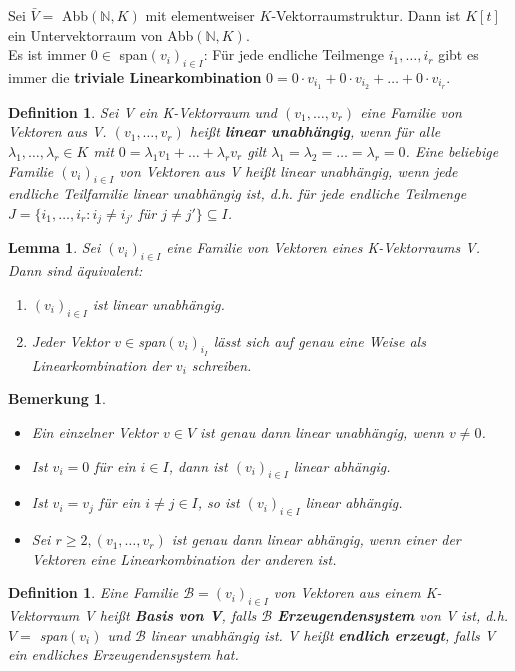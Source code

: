 \documentclass[12pt,a4paper]{article}
\theoremstyle{plain}
\newtheorem{Lemma}[Theorem]{Lemma}
\newtheorem{Definition}[Theorem]{Definition}
\newtheorem{Bemerkung}[Theorem]{Bemerkung}
\newcommand{\herv}[1]{{\emph{\textbf{#1}}}}
\newcommand{\N}{\mathbb{N}}
\numberwithin{equation}{section}
\begin{document}
Sei $\bar{V}=$ Abb$(\N,K)$ mit elementweiser $K$-Vektorraumstruktur. Dann ist $K[t]$ ein Untervektorraum von Abb$(\N,K)$.\\
Es ist immer $0\in$ span$(v_i)_{i\in I}$: Für jede endliche Teilmenge $i_1,\ldots,i_r$ gibt es immer die \textbf{triviale Linearkombination} $0=0\cdot v_{i_1}+0\cdot v_{i_2}+\ldots+0\cdot v_{i_r}$.
\begin{Definition}
Sei V ein K-Vektorraum und $(v_1,\ldots,v_r)$ eine Familie von Vektoren aus V. $(v_1,\ldots,v_r)$ heißt \herv{linear unabhängig}, wenn für alle $\lambda_1 ,\ldots , \lambda_r\in K$ mit $0=\lambda_1 v_1+\ldots+\lambda_r v_r$ gilt $\lambda_1=\lambda_2=\ldots=\lambda_r=0$. Eine beliebige Familie $(v_i)_{i\in I}$ von Vektoren aus V heißt linear unabhängig, wenn jede endliche Teilfamilie linear unabhängig ist, d.h. für jede endliche Teilmenge $J=\{i_1,\ldots,i_r : i_j\neq i_{j'}$ für $j\neq j'\}\subseteq I$.
\end{Definition}
\begin{Lemma}
Sei $(v_i)_{i\in I}$ eine Familie von Vektoren eines K-Vektorraums V. Dann sind äquivalent:
\begin{enumerate}
\renewcommand{\labelenumi}{\emph{(\roman{enumi})}}
\item $(v_i)_{i\in I}$ ist linear unabhängig.
\item Jeder Vektor $v\in$\emph{span}$(v_i)_{i_I}$ lässt sich auf genau eine Weise als Linearkombination der $v_i$ schreiben.
\end{enumerate}
\end{Lemma}
\begin{Bemerkung}\mbox{ }
\begin{itemize}
\item Ein einzelner Vektor $v\in V$ ist genau dann linear unabhängig, wenn $v\neq 0$.
\item Ist $v_i=0$ für ein $i\in I$, dann ist $(v_i)_{i\in I}$ linear abhängig.
\item Ist $v_i=v_j$ für ein $i\neq j \in I$, so ist $(v_i)_{i\in I}$ linear abhängig.
\item Sei $r\geq 2, (v_1,\ldots,v_r)$ ist genau dann linear abhängig, wenn einer der Vektoren eine Linearkombination der anderen ist.
\end{itemize}
\end{Bemerkung}
\begin{Definition}
Eine Familie $\mathcal{B}=(v_i)_{i\in I}$ von Vektoren aus einem K-Vektorraum V heißt \herv{Basis von V}, falls $\mathcal{B}$ \herv{Erzeugendensystem} von V ist, d.h. $V=$ \emph{span}$(v_i)$ und $\mathcal{B}$ linear unabhängig ist. V heißt \herv{endlich erzeugt}, falls V ein endliches Erzeugendensystem hat.
\end{Definition}
\end{document}
